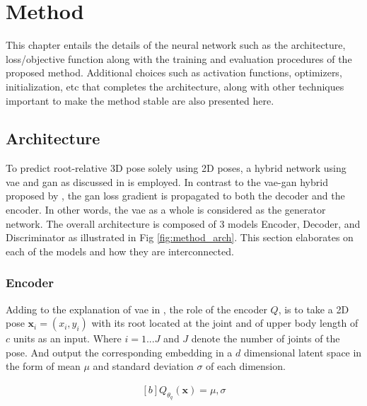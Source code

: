 \chapter{Method}
\label{chap:method}

This chapter entails the details of the neural network such as the architecture, loss/objective function along with the training and evaluation procedures of the proposed method. Additional choices such as activation functions, optimizers, initialization, etc that completes the architecture, along with other techniques important to make the method stable are also presented here.

\section{Architecture}
To predict root-relative 3D pose solely using 2D poses, a hybrid network using \ac{vae} and \ac{gan} as discussed in  is employed. In contrast to the \ac{vae}-\ac{gan} hybrid proposed by \cite{autoencoding_beyond_pixels}, the \ac{gan} loss gradient is propagated to both the decoder and the encoder. In other words, the \ac{vae} as a whole is considered as the generator network. The overall architecture is composed of 3 models Encoder, Decoder, and Discriminator as illustrated in Fig \ref{fig:method_arch}. This section elaborates on each of the models and how they are interconnected. 

\subsection{Encoder}
Adding to the explanation of \ac{vae} in , the role of the encoder $Q$, is to take a 2D pose $\textbf{x}_i = (x_i, y_i)$ with its root located at the joint and of upper body length of $c$ units as an input. Where $i = 1 ... J$ and $J$ denote the number of joints of the pose. And output the corresponding embedding in a $d$ dimensional latent space in the form of mean $\mu$ and standard deviation $\sigma$ of each dimension.

\begin{equation} \label{eqn:Q_fn}
    \begin{gathered}[b]
        Q_{\theta_q}(\textbf{x}) = \mu, \sigma
    \end{gathered}
\end{equation}

